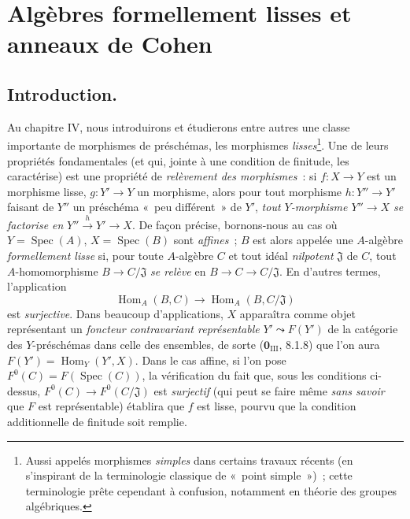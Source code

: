 
\section{Algèbres formellement lisses et anneaux de Cohen}
\label{section:0.19-fr}
\label{0.19-fr}

\setcounter{subsection}{-1}
\subsection{Introduction.}
\label{subsection:0.19.0-fr}
\label{0.19.0-fr}

\begin{env}[19.0.1]
\label{0.19.0.1-fr}
Au chapitre IV, nous introduirons et étudierons entre autres une classe
importante de morphismes de préschémas, les morphismes \emph{lisses}\footnote{Aussi
appelés morphismes \emph{simples} dans certains travaux récents (en s'inspirant
de la terminologie classique de «~point simple~»)~; cette terminologie prête
cependant à confusion, notamment en théorie des groupes algébriques.}. Une de
leurs propriétés fondamentales (et qui, jointe à une condition de finitude, les
caractérise) est une propriété de \emph{relèvement des morphismes}~: si
$f:X\to Y$ est un morphisme lisse, $g:Y'\to Y$ un morphisme, alors pour tout
morphisme $h:Y''\to Y'$ faisant de $Y''$ un préschéma «~peu différent~» de
$Y'$, \emph{tout $Y$-morphisme $Y''\to X$ se factorise en}
$Y''\xrightarrow{h}Y'\to X$. De façon précise, bornons-nous au cas où
$Y=\operatorname{Spec}(A)$, $X=\operatorname{Spec}(B)$ sont \emph{affines}~;
$B$ est alors appelée une $A$-algèbre \emph{formellement lisse} si, pour toute
$A$-algèbre $C$ et tout idéal \emph{nilpotent} $\mathfrak J$ de $C$, tout
$A$-homomorphisme $B\to C/\mathfrak J$ \emph{se relève} en
$B\to C\to C/\mathfrak J$. En d'autres termes, l'application
\[
  \operatorname{Hom}_A(B,C)\longrightarrow
  \operatorname{Hom}_A(B,C/\mathfrak J)
\]
est \emph{surjective}. Dans beaucoup d'applications, $X$ apparaîtra comme objet
représentant un \emph{foncteur contravariant représentable} $Y'\leadsto F(Y')$
de la catégorie des $Y$-préschémas dans celle des ensembles, de sorte
($\mathbf{0}_{\mathrm{III}}$, 8.1.8) que l'on aura
$F(Y')=\operatorname{Hom}_Y(Y',X)$. Dans le cas affine, si l'on pose
$F^0(C)=F(\operatorname{Spec}(C))$, la vérification du fait que, sous les
conditions ci-dessus, $F^0(C)\to F^0(C/\mathfrak J)$ est \emph{surjectif}
(qui peut se faire même \emph{sans savoir} que $F$ est représentable) établira
que $f$ est lisse, pourvu que la condition additionnelle de finitude soit
remplie.
\end{env}

